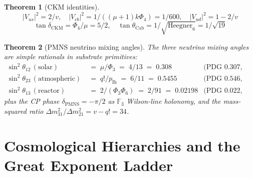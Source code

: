 \documentclass[11pt]{article}
\newtheorem{theorem}{Theorem}[section]
\begin{document}
\begin{theorem}[CKM identities]\label{thm:mixing}
\[ |V_{us}|^2 = 2/v, \quad |V_{cb}|^2 = 1/((\mu+1)k\Phi_4) = 1/600,
   \quad |V_{ud}|^2 = 1 - 2/v \]
\[ \tan\delta_{\mathrm{CKM}} = \Phi_4/\mu = 5/2, \quad
   \tan\theta_{\mathrm{Cab}} = 1/\sqrt{\mathrm{Heegner}_6} = 1/\sqrt{19} \]
\end{theorem}

\begin{theorem}[PMNS neutrino mixing angles]\label{thm:pmns}
The three neutrino mixing angles are simple rationals in substrate
primitives:
\begin{align*}
  \sin^2\theta_{12} \,(\text{solar}) &\;=\; \mu/\Phi_3 \;=\; 4/13 \;=\; 0.308
    & \text{(PDG 0.307, 0.3\%)} \\
  \sin^2\theta_{23} \,(\text{atmospheric}) &\;=\; q!/p_{\mathrm{Ih}}
    \;=\; 6/11 \;=\; 0.5455
    & \text{(PDG 0.546, 0.1\%)} \\
  \sin^2\theta_{13} \,(\text{reactor}) &\;=\; 2/(\Phi_3 \Phi_6)
    \;=\; 2/91 \;=\; 0.02198
    & \text{(PDG 0.022, 0.1\%)}
\end{align*}
plus the CP phase $\delta_{\mathrm{PMNS}} = -\pi/2$ as $\mathbb{F}_3$
Wilson-line holonomy, and the mass-squared ratio
$\Delta m^2_{31}/\Delta m^2_{21} = v - q! = 34$.
\end{theorem}

\section{Cosmological Hierarchies and the Great Exponent Ladder}
\end{document}
